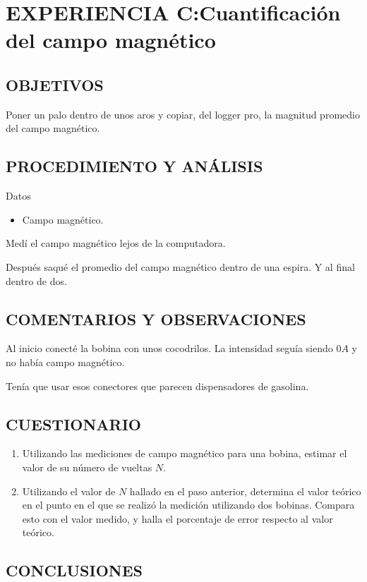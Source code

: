 \documentclass[10pt, twoside]{article}
\begin{document}
\section{EXPERIENCIA C:Cuantificación del campo magnético}%

\subsection{OBJETIVOS}%

Poner un palo dentro de unos aros y copiar, del logger pro, la magnitud promedio
del campo magnético.

\subsection{PROCEDIMIENTO Y ANÁLISIS}%
Datos
\begin{itemize}
	\item Campo magnético.
\end{itemize}

Medí el campo magnético lejos de la computadora.

Después saqué el promedio del campo magnético dentro de una espira.
Y al final dentro de dos.

\subsection{COMENTARIOS Y OBSERVACIONES}%

Al inicio conecté la bobina con unos cocodrilos.
La intensidad seguía siendo $0A$ y no había campo magnético.

Tenía que usar esos conectores que parecen dispensadores de gasolina.

\subsection{CUESTIONARIO}%
\begin{enumerate}[label=\roman*]
	\item Utilizando las mediciones de campo magnético para una bobina,
		estimar el valor de su número de vueltas $N$.
	\item Utilizando el valor de $N$ hallado en el paso anterior,
		determina el valor teórico en el punto en el que se realizó la medición
		utilizando dos bobinas.
		Compara esto con el valor medido,
		y halla el porcentaje de error respecto al valor teórico.
\end{enumerate}

\subsection{CONCLUSIONES}%
\end{document}
